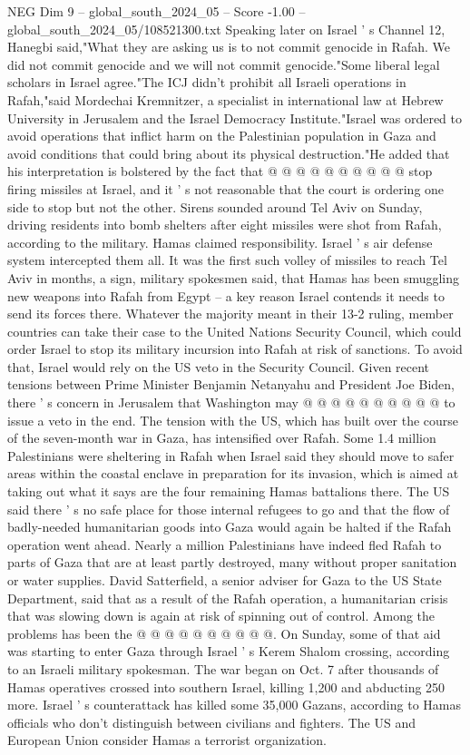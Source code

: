 \begin{textsample}{NEG Dim 9 – global\_south\_2024\_05 – Score -1.00 – global\_south\_2024\_05/108521300.txt}
Speaking later on Israel ' s Channel 12, Hanegbi said,"What they are asking us is to not commit genocide in Rafah.
We did not commit genocide and we will not commit genocide."Some liberal legal scholars in Israel agree."The ICJ didn't prohibit all Israeli operations in Rafah,"said Mordechai Kremnitzer, a specialist in international law at Hebrew University in Jerusalem and the Israel Democracy Institute."Israel was ordered to avoid operations that inflict harm on the Palestinian population in Gaza and avoid conditions that could bring about its physical destruction."He added that his interpretation is bolstered by the fact that @ @ @ @ @ @ @ @ @ @ stop firing missiles at Israel, and it ' s not reasonable that the court is ordering one side to stop but not the other.
Sirens sounded around Tel Aviv on Sunday, driving residents into bomb shelters after eight missiles were shot from Rafah, according to the military.
Hamas claimed responsibility.
Israel ' s air defense system intercepted them all.
It was the first such volley of missiles to reach Tel Aviv in months, a sign, military spokesmen said, that Hamas has been smuggling new weapons into Rafah from Egypt -- a key reason Israel contends it needs to send its forces there.
Whatever the majority meant in their 13-2 ruling, member countries can take their case to the United Nations Security Council, which could order Israel to stop its military incursion into Rafah at risk of sanctions.
To avoid that, Israel would rely on the US veto in the Security Council.
Given recent tensions between Prime Minister Benjamin Netanyahu and President Joe Biden, there ' s concern in Jerusalem that Washington may @ @ @ @ @ @ @ @ @ @ to issue a veto in the end.
The tension with the US, which has built over the course of the seven-month war in Gaza, has intensified over Rafah.
Some 1.4 million Palestinians were sheltering in Rafah when Israel said they should move to safer areas within the coastal enclave in preparation for its invasion, which is aimed at taking out what it says are the four remaining Hamas battalions there.
The US said there ' s no safe place for those internal refugees to go and that the flow of badly-needed humanitarian goods into Gaza would again be halted if the Rafah operation went ahead.
Nearly a million Palestinians have indeed fled Rafah to parts of Gaza that are at least partly destroyed, many without proper sanitation or water supplies.
David Satterfield, a senior adviser for Gaza to the US State Department, said that as a result of the Rafah operation, a humanitarian crisis that was slowing down is again at risk of spinning out of control.
Among the problems has been the @ @ @ @ @ @ @ @ @ @.
On Sunday, some of that aid was starting to enter Gaza through Israel ' s Kerem Shalom crossing, according to an Israeli military spokesman.
The war began on Oct. 7 after thousands of Hamas operatives crossed into southern Israel, killing 1,200 and abducting 250 more.
Israel ' s counterattack has killed some 35,000 Gazans, according to Hamas officials who don't distinguish between civilians and fighters.
The US and European Union consider Hamas a terrorist organization.

\end{textsample}
